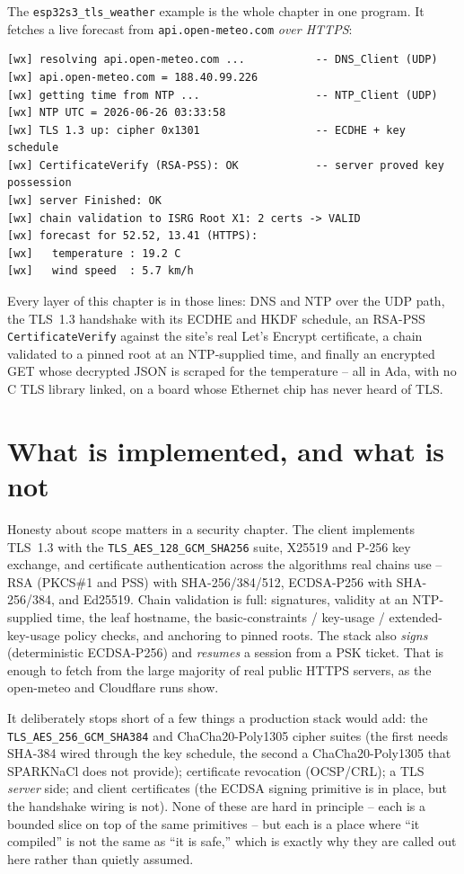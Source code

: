 The \texttt{esp32s3\_tls\_weather} example is the whole chapter in one program. It
fetches a live forecast from \texttt{api.open-meteo.com} \emph{over HTTPS}:

\begin{lstlisting}
[wx] resolving api.open-meteo.com ...           -- DNS_Client (UDP)
[wx] api.open-meteo.com = 188.40.99.226
[wx] getting time from NTP ...                  -- NTP_Client (UDP)
[wx] NTP UTC = 2026-06-26 03:33:58
[wx] TLS 1.3 up: cipher 0x1301                  -- ECDHE + key schedule
[wx] CertificateVerify (RSA-PSS): OK            -- server proved key possession
[wx] server Finished: OK
[wx] chain validation to ISRG Root X1: 2 certs -> VALID
[wx] forecast for 52.52, 13.41 (HTTPS):
[wx]   temperature : 19.2 C
[wx]   wind speed  : 5.7 km/h
\end{lstlisting}

Every layer of this chapter is in those lines: DNS and NTP over the UDP path, the
TLS~1.3 handshake with its ECDHE and HKDF schedule, an RSA-PSS
\texttt{CertificateVerify} against the site's real Let's Encrypt certificate, a
chain validated to a pinned root at an NTP-supplied time, and finally an encrypted
GET whose decrypted JSON is scraped for the temperature -- all in Ada, with no C
TLS library linked, on a board whose Ethernet chip has never heard of TLS.

\section{What is implemented, and what is not}
\label{ch:tls:status}

Honesty about scope matters in a security chapter. The client implements TLS~1.3
with the \texttt{TLS\_AES\_128\_GCM\_SHA256} suite, X25519 and P-256 key exchange,
and certificate authentication across the algorithms real chains use -- RSA
(PKCS\#1 and PSS) with SHA-256/384/512, ECDSA-P256 with SHA-256/384, and Ed25519.
Chain validation is full: signatures, validity at an NTP-supplied time, the leaf
hostname, the basic-constraints / key-usage / extended-key-usage policy checks,
and anchoring to pinned roots. The stack also \emph{signs} (deterministic
ECDSA-P256) and \emph{resumes} a session from a PSK ticket. That is enough to
fetch from the large majority of real public HTTPS servers, as the open-meteo and
Cloudflare runs show.

It deliberately stops short of a few things a production stack would add: the
\texttt{TLS\_AES\_256\_GCM\_SHA384} and ChaCha20-Poly1305 cipher suites (the first
needs SHA-384 wired through the key schedule, the second a ChaCha20-Poly1305 that
SPARKNaCl does not provide); certificate revocation (OCSP/CRL); a TLS \emph{server}
side; and client certificates (the ECDSA signing primitive is in place, but the
handshake wiring is not). None of these are hard in principle -- each is a bounded
slice on top of the same primitives -- but each is a place where ``it compiled''
is not the same as ``it is safe,'' which is exactly why they are called out here
rather than quietly assumed.
